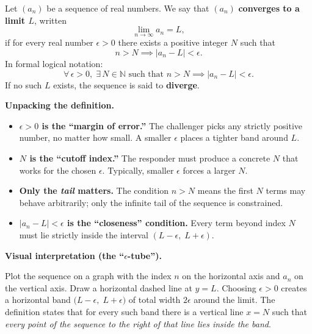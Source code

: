 
\begin{definition}
Let $(a_n)$ be a sequence of real numbers. We say that $(a_n)$ \textbf{converges to a limit $L$}, written
\[
  \lim_{n \to \infty} a_n = L,
\]
if for every real number $\epsilon > 0$ there exists a positive integer $N$ such that
\[
  n > N \implies |a_n - L| < \epsilon.
\]
In formal logical notation:
\[
  \forall\, \epsilon > 0,\; \exists\, N \in \mathbb{N} \text{ such that } n > N \implies |a_n - L| < \epsilon.
\]
If no such $L$ exists, the sequence is said to \textbf{diverge}.
\end{definition}

\medskip
\noindent\textbf{Unpacking the definition.}

\begin{itemize}[leftmargin=*]
  \item \textbf{$\epsilon > 0$ is the ``margin of error.''} The challenger picks any strictly positive number,
        no matter how small. A smaller $\epsilon$ places a tighter band around $L$.

  \item \textbf{$N$ is the ``cutoff index.''} The responder must produce a concrete $N$ that works for the
        chosen $\epsilon$. Typically, smaller $\epsilon$ forces a larger $N$.

  \item \textbf{Only the \emph{tail} matters.} The condition $n > N$ means the first $N$ terms may behave
        arbitrarily; only the infinite tail of the sequence is constrained.

  \item \textbf{$|a_n - L| < \epsilon$ is the ``closeness'' condition.} Every term beyond index $N$ must
        lie strictly inside the interval $(L - \epsilon,\; L + \epsilon)$.
\end{itemize}

\medskip
\noindent\textbf{Visual interpretation (the ``$\epsilon$-tube'').}

Plot the sequence on a graph with the index $n$ on the horizontal axis and $a_n$ on the vertical axis.
Draw a horizontal dashed line at $y = L$. Choosing $\epsilon > 0$ creates a horizontal band
$\bigl(L - \epsilon,\; L + \epsilon\bigr)$ of total width $2\epsilon$ around the limit.
The definition states that for every such band there is a vertical line $x = N$ such that
\emph{every point of the sequence to the right of that line lies inside the band}.

